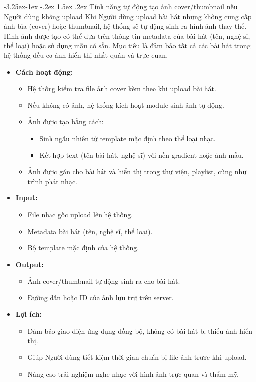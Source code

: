 \documentclass[a4paper]{article}
\makeatletter
\newcommand{\cach}{\hspace*{1.5em}\ignorespaces}
\newcounter {subsubsubsection}[subsubsection]
\newcommand\subsubsubsection{\@startsection{subsubsubsection}{4}{\z@}%
                                     {-3.25ex\@plus -1ex \@minus -.2ex}%
                                     {1.5ex \@plus .2ex}%
                                     {\normalfont\normalsize\bfseries}}
\makeatother
\begin{document}
\subsubsubsection{Tính năng tự động tạo ảnh cover/thumbnail nếu Người dùng không upload}
\cach Khi Người dùng upload bài hát nhưng không cung cấp ảnh bìa (cover) hoặc thumbnail, hệ thống sẽ tự động sinh ra hình ảnh thay thế. 
Hình ảnh được tạo có thể dựa trên thông tin metadata của bài hát (tên, nghệ sĩ, thể loại) hoặc sử dụng mẫu có sẵn. 
Mục tiêu là đảm bảo tất cả các bài hát trong hệ thống đều có ảnh hiển thị nhất quán và trực quan.

\begin{itemize}
    \item \textbf{Cách hoạt động:}
    \begin{itemize}
        \item Hệ thống kiểm tra file ảnh cover kèm theo khi upload bài hát.
        \item Nếu không có ảnh, hệ thống kích hoạt module sinh ảnh tự động.
        \item Ảnh được tạo bằng cách:
        \begin{itemize}
            \item Sinh ngẫu nhiên từ template mặc định theo thể loại nhạc.
            \item Kết hợp text (tên bài hát, nghệ sĩ) với nền gradient hoặc ảnh mẫu.
        \end{itemize}
        \item Ảnh được gán cho bài hát và hiển thị trong thư viện, playlist, cũng như trình phát nhạc.
    \end{itemize}

    \item \textbf{Input:}
    \begin{itemize}
        \item File nhạc gốc upload lên hệ thống.
        \item Metadata bài hát (tên, nghệ sĩ, thể loại).
        \item Bộ template mặc định của hệ thống.
    \end{itemize}

    \item \textbf{Output:}
    \begin{itemize}
        \item Ảnh cover/thumbnail tự động sinh ra cho bài hát.
        \item Đường dẫn hoặc ID của ảnh lưu trữ trên server.
    \end{itemize}


    \item \textbf{Lợi ích:}
    \begin{itemize}
        \item Đảm bảo giao diện ứng dụng đồng bộ, không có bài hát bị thiếu ảnh hiển thị.
        \item Giúp Người dùng tiết kiệm thời gian chuẩn bị file ảnh trước khi upload.
        \item Nâng cao trải nghiệm nghe nhạc với hình ảnh trực quan và thẩm mỹ.
    \end{itemize}
\end{itemize}
\end{document}
